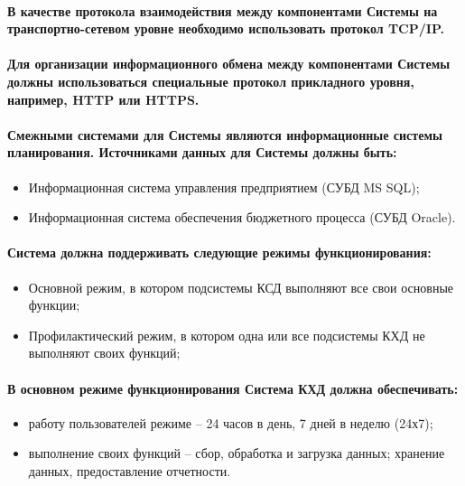 \documentclass{article}
\begin{document}
        \paragraph{В качестве протокола взаимодействия между компонентами Системы на транспортно-сетевом уровне необходимо использовать протокол TCP/IP.}
        \paragraph{Для организации информационного обмена между компонентами Системы должны использоваться специальные протокол прикладного уровня, например, HTTP или HTTPS. }
        
        \paragraph{Смежными системами для Системы являются информационные системы планирования. Источниками данных для Системы должны быть:}
        
        \begin{itemize}
            \item Информационная система управления предприятием (СУБД MS SQL);
            \item Информационная система обеспечения бюджетного процесса (СУБД Oracle).
        \end{itemize}    
        
        \paragraph{Система должна поддерживать следующие режимы функционирования: }
        \begin{itemize}
            \item Основной режим, в котором подсистемы КСД выполняют все свои основные функции;
            \item Профилактический режим, в котором одна или все подсистемы КХД не выполняют своих функций;
        \end{itemize} 
        
        \paragraph{В основном режиме функционирования Система КХД должна обеспечивать:}
        \begin{itemize}
            \item работу пользователей режиме – 24 часов в день, 7 дней в неделю (24х7);
            \item выполнение своих функций – сбор, обработка и загрузка данных; хранение данных, предоставление отчетности.
        \end{itemize}
        
\end{document}
